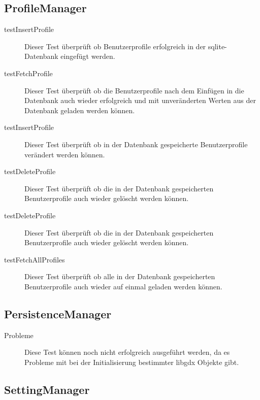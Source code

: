 \subsection{ProfileManager}

\begin{description}

\item[testInsertProfile]
Dieser Test überprüft ob Benutzerprofile erfolgreich in der sqlite-Datenbank eingefügt werden. 

\item[testFetchProfile]
Dieser Test überprüft ob die Benutzerprofile nach dem Einfügen in die Datenbank auch wieder erfolgreich und mit unveränderten Werten aus der Datenbank geladen werden können.

\item[testInsertProfile]
Dieser Test überprüft ob in der Datenbank gespeicherte Benutzerprofile verändert werden können.

\item[testDeleteProfile]
Dieser Test überprüft ob die in der Datenbank gespeicherten Benutzerprofile auch wieder gelöscht werden können.

\item[testDeleteProfile]
Dieser Test überprüft ob die in der Datenbank gespeicherten Benutzerprofile auch wieder gelöscht werden können.

\item[testFetchAllProfiles]
Dieser Test überprüft ob alle in der Datenbank gespeicherten Benutzerprofile auch wieder auf einmal geladen werden können.

\end{description}


\subsection{PersistenceManager}

\begin{description}

\item[Probleme]
Diese Test können noch nicht erfolgreich ausgeführt werden, da es Probleme mit bei der Initialisierung bestimmter libgdx Objekte gibt.

\end{description}

\subsection{SettingManager}


